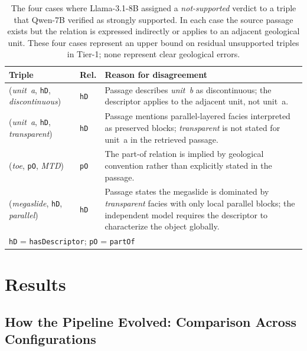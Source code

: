 \documentclass[10pt]{article}
\newcommand{\pred}[1]{\texttt{\small #1}}
\begin{document}
\begin{table}[htb]
\centering
\caption{The four cases where Llama-3.1-8B assigned a
  \emph{not-supported} verdict to a triple that Qwen-7B
  verified as strongly supported.
  In each case the source passage exists but the relation
  is expressed indirectly or applies to an adjacent
  geological unit.
  These four cases represent an upper bound on residual
  unsupported triples in Tier-1; none represent clear
  geological errors.}
\label{tab:expd-disagreements}
\small
\setlength{\tabcolsep}{4pt}
\begin{tabular}{p{3.8cm}lp{5.6cm}}
\toprule
\textbf{Triple} & \textbf{Rel.} &
\textbf{Reason for disagreement} \\
\midrule
(\emph{unit~a}, \pred{hD}, \emph{discontinuous})
  & \pred{hD}
  & Passage describes \emph{unit~b} as discontinuous;
  the descriptor applies to the adjacent unit,
  not unit~a. \\
\midrule
(\emph{unit~a}, \pred{hD}, \emph{transparent})
  & \pred{hD}
  & Passage mentions parallel-layered facies interpreted
  as preserved blocks; \emph{transparent} is not
  stated for unit~a in the retrieved passage. \\
\midrule
(\emph{toe}, \pred{pO}, \emph{MTD})
  & \pred{pO}
  & The part-of relation is implied by geological
  convention rather than explicitly stated in the
  passage. \\
\midrule
(\emph{megaslide}, \pred{hD}, \emph{parallel})
  & \pred{hD}
  & Passage states the megaslide is dominated by
  \emph{transparent} facies with only local parallel
  blocks; the independent model requires the descriptor
  to characterize the object globally. \\
\bottomrule
\multicolumn{3}{l}{\small \pred{hD} = \pred{hasDescriptor};
  \pred{pO} = \pred{partOf}}
\end{tabular}
\end{table}
\section{Results}
\label{sec:results}

\subsection{How the Pipeline Evolved: Comparison Across Configurations}
\label{sec:evolution}
\end{document}
